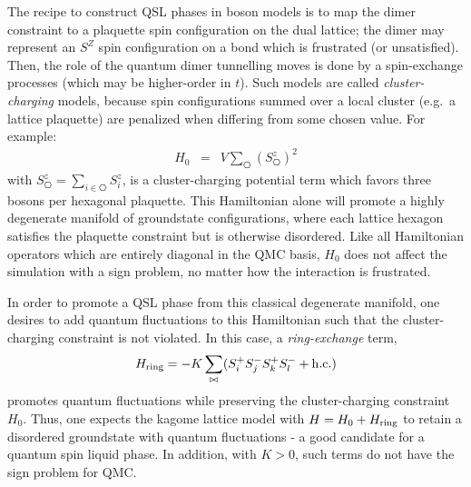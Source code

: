 \documentclass[range]{ar2e}
\begin{document}
The recipe to construct QSL phases in boson models is to map the dimer constraint to a plaquette spin configuration on the dual lattice; the dimer may represent an $S^Z$ spin configuration on a bond which is frustrated (or unsatisfied).  Then, the role of the quantum dimer tunnelling moves is done by a spin-exchange processes (which may be higher-order in $t$).  Such models are called
{\it cluster-charging} models,\cite{Isakov2} because spin configurations summed over a local cluster (e.g.~a lattice plaquette) are penalized when differing from some chosen value.  For example:
\begin{eqnarray}
H_0 &=& V \sum_{\hexagon} (S^z_{\hexagon})^2 
\end{eqnarray}
with $S^z_{\hexagon} = \sum_{i \in \hexagon}S^z_i$,
is a cluster-charging potential term which favors three bosons per hexagonal plaquette.  This Hamiltonian alone will promote a highly degenerate manifold of groundstate configurations, where each lattice hexagon satisfies the plaquette constraint but is otherwise disordered.  
Like all Hamiltonian operators which are entirely diagonal in the QMC basis, $H_0$ does not affect the simulation with a sign problem, no matter how the interaction is frustrated.

In order to promote a QSL phase from this classical degenerate manifold, one desires to add quantum fluctuations to this Hamiltonian such that the cluster-charging constraint is not violated.  In this case, a {\it ring-exchange} term, 
\begin{eqnarray}
H_{\rm ring} = -K \sum_{\bowtie} ( S_i^{+} S_j^{-} S_k^{+} S_l^{-} + {\rm h.c.} )
\end{eqnarray} 
promotes quantum fluctuations while preserving the cluster-charging constraint $H_0$.  Thus, one expects the kagome lattice model with $H = H_0 + H_{\rm ring}$ to retain a disordered groundstate with quantum fluctuations - a good candidate for a quantum spin liquid phase.  In addition, with $K>0$, such terms do not have the sign problem for QMC.
\end{document}
